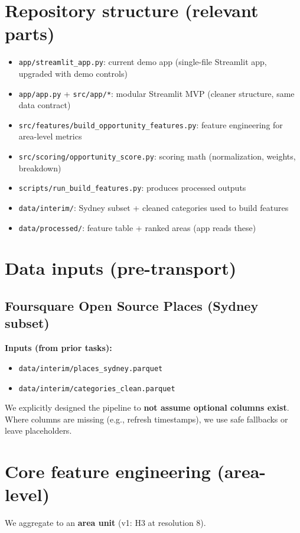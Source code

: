 \documentclass[11pt]{article}
\begin{document}
\section{Repository structure (relevant parts)}
\begin{itemize}
  \item \texttt{app/streamlit\_app.py}: current demo app (single-file Streamlit app, upgraded with demo controls)
  \item \texttt{app/app.py} + \texttt{src/app/*}: modular Streamlit MVP (cleaner structure, same data contract)
  \item \texttt{src/features/build\_opportunity\_features.py}: feature engineering for area-level metrics
  \item \texttt{src/scoring/opportunity\_score.py}: scoring math (normalization, weights, breakdown)
  \item \texttt{scripts/run\_build\_features.py}: produces processed outputs
  \item \texttt{data/interim/}: Sydney subset + cleaned categories used to build features
  \item \texttt{data/processed/}: feature table + ranked areas (app reads these)
\end{itemize}

\section{Data inputs (pre-transport)}

\subsection{Foursquare Open Source Places (Sydney subset)}
\textbf{Inputs (from prior tasks):}
\begin{itemize}
  \item \texttt{data/interim/places\_sydney.parquet}
  \item \texttt{data/interim/categories\_clean.parquet}
\end{itemize}

\noindent We explicitly designed the pipeline to \textbf{not assume optional columns exist}. Where columns are missing (e.g., refresh timestamps), we use safe fallbacks or leave placeholders.

\section{Core feature engineering (area-level)}
\noindent We aggregate to an \textbf{area unit} (v1: H3 at resolution 8).
\end{document}

